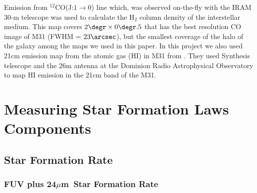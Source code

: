 \documentclass[useAMS,usenatbib]{mn2e}
\newcommand \um    {$\mu$m\ }
\begin{document}
Emission from $^{12}$CO(J:$1\rightarrow0$) line which, was observed on-the-fly with the IRAM 30-m telescope\citep{Nieten06} was used to calculate the H$_2$ column density of the interstellar medium. This map covers $2\degr \times 0\degr.5$ that has the best resolution CO image of M31 (FWHM = $23\arcsec$), but the smallest coverage of the halo of the galaxy among the maps we used in this paper. In this project we also used 21cm emission map from the atomic gas (HI) in M31 from \cite{Chemin09}. They used Synthesis telescope and the 26m antenna at the Dominion Radio Astrophysical Observatory to map HI emission in the 21cm band of the M31.

\section{Measuring Star Formation Laws Components}

\subsection{Star Formation Rate}
\label{sec:sfr}
\subsubsection{FUV plus 24\um Star Formation Rate}
\end{document}
